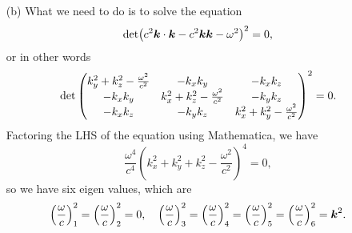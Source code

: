 \documentclass[hyperref, a4paper]{article}
\begin{document}
\begin{itemize}
\item[(b)] What we need to do is to solve the equation 
\[
    \det( c^2 \vb*{k} \cdot \vb*{k} - c^2 \vb*{k} \vb*{k} - \omega^2)^2 = 0,
\] 
or in other words 
\[
    \det\pmqty{
        k_y^2 + k_z^2 - \frac{\omega^2}{c^2} & - k_x k_y & - k_x k_z \\
        - k_x k_y & k_x^2 + k_z^2 - \frac{\omega^2}{c^2} & - k_y k_z \\
        - k_x k_z & - k_y k_z & k_x^2 + k_y^2 - \frac{\omega^2}{c^2} 
    }^2 = 0.
\]
Factoring the LHS of the equation using Mathematica, we have 
\[
    \frac{\omega^4}{c^4} \left( k_x^2 + k_y^2 + k_z^2 - \frac{\omega^2}{c^2} \right)^4 = 0,
\]
so we have six eigen values, which are 
\begin{equation}
    \left(\frac{\omega}{c}\right)^2_1 = \left(\frac{\omega}{c}\right)^2_2 = 0, \quad 
    \left(\frac{\omega}{c}\right)^2_3 = \left(\frac{\omega}{c}\right)^2_4 
    = \left(\frac{\omega}{c}\right)^2_5 = \left(\frac{\omega}{c}\right)^2_6 = \vb*{k}^2.
\end{equation}


\end{itemize}
\end{document}
